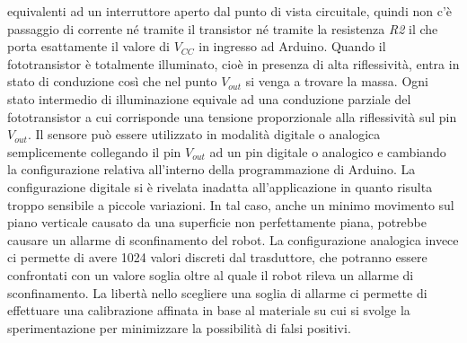 equivalenti ad un interruttore aperto dal punto di vista circuitale, quindi 
non c'è passaggio di corrente né tramite il transistor né tramite la 
resistenza \textit{R2} il che porta esattamente il valore di $V_{CC}$ in 
ingresso ad Arduino. Quando il fototransistor è totalmente illuminato, cioè in 
presenza di alta riflessività, entra in stato di conduzione così che nel punto 
$V_{out}$ si venga a trovare la massa. Ogni stato intermedio di illuminazione 
equivale ad una conduzione parziale del fototransistor a cui corrisponde una 
tensione proporzionale alla riflessività sul pin $V_{out}$. Il sensore può 
essere utilizzato in modalità digitale o analogica semplicemente collegando il 
pin $V_{out}$ ad un pin digitale o analogico e cambiando la configurazione 
relativa all'interno della programmazione di Arduino. La configurazione 
digitale si è rivelata inadatta all'applicazione in quanto risulta troppo sensibile a piccole variazioni. 
In tal caso, anche un minimo movimento sul piano verticale causato da una superficie non perfettamente piana, 
potrebbe causare un allarme di sconfinamento del robot. La configurazione 
analogica invece ci permette di avere 1024 valori discreti dal 
trasduttore, che potranno essere confrontati con un valore soglia oltre al 
quale il robot rileva un allarme di sconfinamento. La libertà nello scegliere 
una soglia di allarme ci permette di effettuare una calibrazione affinata in 
base al materiale su cui si svolge la sperimentazione per minimizzare la possibilità di 
falsi positivi. 

